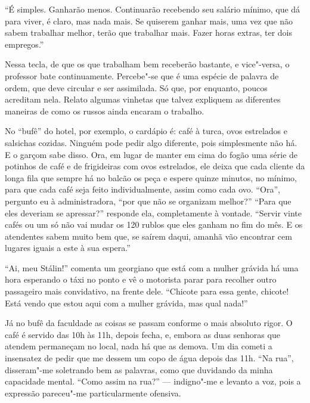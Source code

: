 ``É simples. Ganharão menos. Continuarão recebendo seu salário mínimo, que dá para viver, é claro, mas nada mais. Se quiserem ganhar mais, uma vez que não sabem trabalhar melhor, terão que trabalhar mais. Fazer horas extras, ter dois empregos.''

Nessa tecla, de que os que trabalham bem receberão bastante, e vice"-versa, o professor bate continuamente. Percebe"-se que é uma espécie de palavra de ordem, que deve circular e ser assimilada. Só que, por enquanto, poucos acreditam nela. Relato algumas vinhetas que talvez expliquem as diferentes maneiras de como os russos ainda encaram o trabalho.

No ``bufê'' do hotel, por exemplo, o cardápio é: café à turca, ovos estrelados e salsichas cozidas. Ninguém pode pedir algo diferente, pois simplesmente não há. E o garçom sabe disso. Ora, em lugar de manter em cima do fogão uma série de potinhos de café e de frigideiras com ovos estrelados, ele deixa que cada cliente da longa fila que sempre há no balcão os peça e espere quinze minutos, no mínimo, para que cada café seja feito individualmente, assim como cada ovo. ``Ora'', pergunto eu à administradora, ``por que não se organizam melhor?'' ``Para que eles deveriam se apressar?'' responde ela, completamente à vontade. ``Servir vinte cafés ou um só não vai mudar os 120 rublos que eles ganham no fim do mês. E os atendentes sabem muito bem que, se saírem daqui, amanhã vão encontrar cem lugares iguais a este à sua espera.''

``Ai, meu Stálin!'' comenta um georgiano que está com a mulher grávida há uma hora esperando o táxi no ponto e vê o motorista parar para recolher outro passageiro mais convidativo, na frente dele. ``Chicote para essa gente, chicote! Está vendo que estou aqui com a mulher grávida, mas qual nada!''

Já no bufê da faculdade as coisas se passam conforme o mais absoluto rigor. O café é servido das 10h às 11h, depois fecha, e, embora as duas senhoras que atendem permaneçam no local, nada há que as demova. Um dia cometi a insensatez de pedir que me dessem um copo de água depois das 11h. ``Na rua'', disseram"-me soletrando bem as palavras, como que duvidando da minha capacidade mental. ``Como assim na rua?'' --- indigno"-me e levanto a voz, pois a expressão pareceu"-me particularmente ofensiva.

